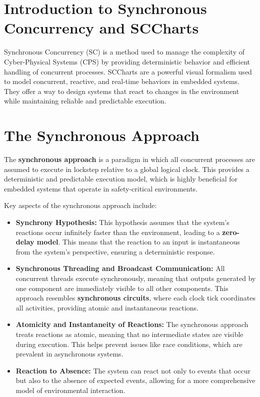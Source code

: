\documentclass[
  14pt,
  a4paper,
  numbers=noendperiod,
  headinclude=true,
  footinclude=true,
  DIV=calc]{scrreprt}
\begin{document}
\section{Introduction to Synchronous Concurrency and
SCCharts}\label{introduction-to-synchronous-concurrency-and-sccharts}

Synchronous Concurrency (SC) is a method used to manage the complexity
of Cyber-Physical Systems (CPS) by providing deterministic behavior and
efficient handling of concurrent processes. SCCharts are a powerful
visual formalism used to model concurrent, reactive, and real-time
behaviors in embedded systems. They offer a way to design systems that
react to changes in the environment while maintaining reliable and
predictable execution.

\section{The Synchronous Approach}\label{the-synchronous-approach}

The \textbf{synchronous approach} is a paradigm in which all concurrent
processes are assumed to execute in lockstep relative to a global
logical clock. This provides a deterministic and predictable execution
model, which is highly beneficial for embedded systems that operate in
safety-critical environments.

Key aspects of the synchronous approach include:

\begin{itemize}
\item
  \textbf{Synchrony Hypothesis:} This hypothesis assumes that the
  system's reactions occur infinitely faster than the environment,
  leading to a \textbf{zero-delay model}. This means that the reaction
  to an input is instantaneous from the system's perspective, ensuring a
  deterministic response.
\item
  \textbf{Synchronous Threading and Broadcast Communication:} All
  concurrent threads execute synchronously, meaning that outputs
  generated by one component are immediately visible to all other
  components. This approach resembles \textbf{synchronous circuits},
  where each clock tick coordinates all activities, providing atomic and
  instantaneous reactions.
\item
  \textbf{Atomicity and Instantaneity of Reactions:} The synchronous
  approach treats reactions as atomic, meaning that no intermediate
  states are visible during execution. This helps prevent issues like
  race conditions, which are prevalent in asynchronous systems.
\item
  \textbf{Reaction to Absence:} The system can react not only to events
  that occur but also to the absence of expected events, allowing for a
  more comprehensive model of environmental interaction.
\end{itemize}
\end{document}

